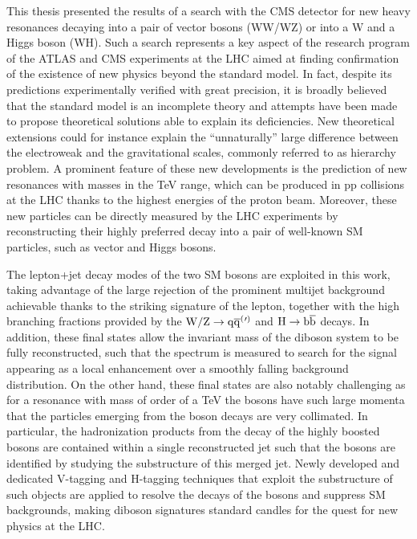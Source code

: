 This thesis presented the results of a search with the CMS detector for new heavy resonances decaying into a pair of vector bosons (WW/WZ) or into a W and a Higgs boson (WH).
Such a search represents a key aspect of the research program of the ATLAS and CMS experiments at the LHC aimed at finding confirmation of the existence of new physics beyond the standard model.
In fact, despite its predictions experimentally verified with great precision, it is broadly believed that the standard model is an incomplete theory and attempts have been made to propose theoretical solutions able to explain its deficiencies. New theoretical extensions could for instance explain the ``unnaturally'' large difference between the electroweak and the gravitational scales, commonly referred to as hierarchy problem. A prominent feature of these new developments is the prediction of new resonances with masses in the TeV range, which can be produced in pp collisions at the LHC thanks to the highest energies of the proton beam.
Moreover, these new particles can be directly measured by the LHC experiments by reconstructing their highly preferred decay into a pair of well-known SM particles, such as vector and Higgs bosons.

The lepton+jet decay modes of the two SM bosons are exploited in this work, taking advantage of the large rejection of the prominent multijet background achievable thanks to the striking signature of the lepton, together with the high branching fractions provided by the $\mathrm{W}/\mathrm{Z}\to\mathrm{q}\overline{\mathrm{q}}^({}'^){}$ and $\mathrm{H}\to{\mathrm{b}\overline{\mathrm{b}}}$ decays. In addition, these final states allow the invariant mass of the diboson system to be fully reconstructed, such that the spectrum is measured to search for the signal appearing as a local enhancement over a smoothly falling background distribution. On the other hand, these final states are also notably challenging as for a resonance with mass of order of a TeV the bosons have such large momenta that the particles emerging from the boson decays are very collimated. In particular, the hadronization products from the decay of the highly boosted bosons are contained within a single reconstructed jet such that the bosons are identified by studying the substructure of this merged jet. Newly developed and dedicated V-tagging and H-tagging techniques that exploit the substructure of such objects are applied to resolve the decays of the bosons and suppress SM backgrounds, making diboson signatures standard candles for the quest for new physics at the LHC.

